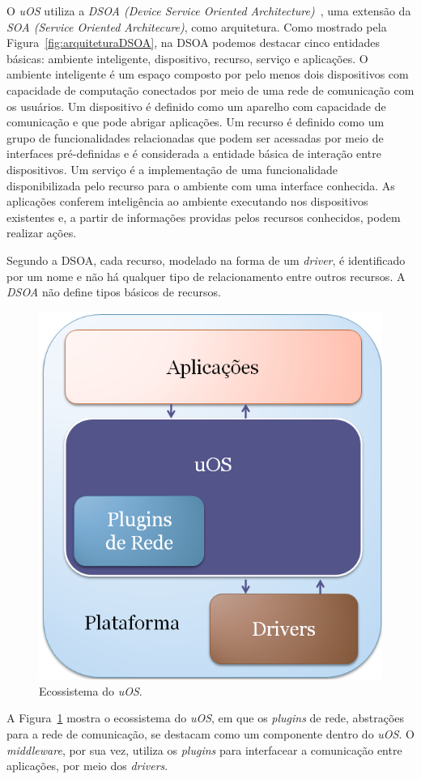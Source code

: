 O \emph{uOS} utiliza a \emph{DSOA (Device Service Oriented Architecture)}~\cite{buzetoDSOA2010}, uma extensão da \emph{SOA (Service Oriented Architecure)}, como arquitetura. Como mostrado pela Figura~\ref{fig:arquiteturaDSOA}, na DSOA podemos destacar cinco entidades básicas: ambiente inteligente, dispositivo, recurso, serviço e aplicações. O ambiente inteligente é um espaço composto por pelo menos dois dispositivos com capacidade de computação conectados por meio de uma rede de comunicação com os usuários. Um dispositivo é definido como um aparelho com capacidade de comunicação e que pode abrigar aplicações. Um recurso é definido como um grupo de funcionalidades relacionadas que podem ser acessadas por meio de interfaces pré-definidas e é considerada a entidade básica de interação entre dispositivos. Um serviço é a implementação de uma funcionalidade disponibilizada pelo recurso para o ambiente com uma interface conhecida. As aplicações conferem inteligência ao ambiente executando nos dispositivos existentes e, a partir de informações providas pelos recursos conhecidos, podem realizar ações. 

Segundo a DSOA, cada recurso, modelado na forma de um \emph{driver}, é identificado por um nome e não há qualquer tipo de relacionamento entre outros recursos. A \emph{DSOA} não define tipos básicos de recursos.	

\begin{figure}[ht]
	\center
	\includegraphics[scale=0.4]{imagens/ecossistemaUbiquitos}
	\caption{Ecossistema do \emph{uOS}.}
	\label{fig:ecossistemaUbiquitos}
\end{figure}

A Figura~\ref{fig:ecossistemaUbiquitos} mostra o ecossistema do \emph{uOS}, em que os \emph{plugins} de rede, abstrações para a rede de comunicação, se destacam como um componente dentro do \emph{uOS}. O \emph{middleware}, por sua vez, utiliza os \emph{plugins} para interfacear a comunicação entre aplicações, por meio dos \emph{drivers}.